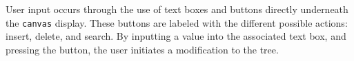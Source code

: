 User input occurs through the use of text boxes and buttons directly
underneath the \texttt{canvas} display. These buttons are labeled with
the different possible actions: insert, delete, and search. By
inputting a value into the associated text box, and pressing the
button, the user initiates a modification to the tree.

